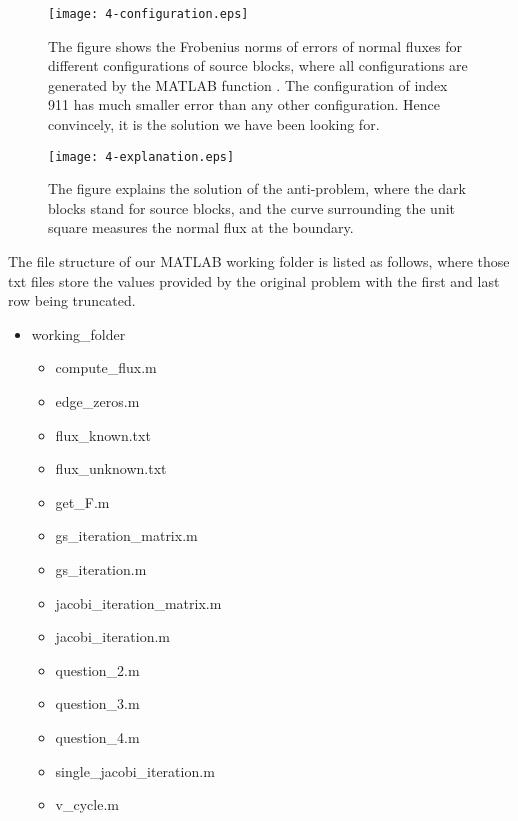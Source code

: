 \documentclass{assignment}[2019/10/15]
\begin{document}
    \begin{figure}[htb]
        \centering
        \texttt{[image: 4-configuration.eps]}
        \caption{The figure shows the Frobenius norms of errors of normal fluxes for different configurations of source blocks, where all configurations are generated by the MATLAB function . The configuration of index 911 has much smaller error than any other configuration. Hence convincely, it is the solution we have been looking for.}
        \label{fig: q4-cfg}
    \end{figure}
    \begin{figure}[htb]
        \centering
        \texttt{[image: 4-explanation.eps]}
        \caption{The figure explains the solution of the anti-problem, where the dark blocks stand for source blocks, and the curve surrounding the unit square measures the normal flux at the boundary.}
        \label{fig: q4-exp}
    \end{figure}

    \clearpage
    \appendix

    The file structure of our MATLAB working folder is listed as follows, where those txt files store the values provided by the original problem with the first and last row being truncated.

    \begin{itemize}
        \item working\_folder
        \begin{itemize}
            \item compute\_flux.m
            \item edge\_zeros.m
            \item flux\_known.txt
            \item flux\_unknown.txt
            \item get\_F.m
            \item gs\_iteration\_matrix.m
            \item gs\_iteration.m
            \item jacobi\_iteration\_matrix.m
            \item jacobi\_iteration.m
            \item question\_2.m
            \item question\_3.m
            \item question\_4.m
            \item single\_jacobi\_iteration.m
            \item v\_cycle.m
        \end{itemize}
    \end{itemize}
\end{document}
